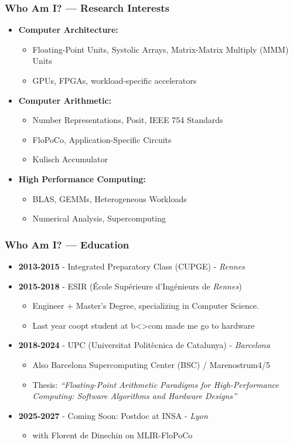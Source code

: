 \begin{frame}
	\frametitle{Who Am I? — Research Interests}
	\begin{itemize}
		\item<1-> \textbf{Computer Architecture:}
		\begin{itemize}
			\item Floating-Point Units, Systolic Arrays, Matrix-Matrix Multiply (MMM) Units
			\item GPUs, FPGAs, workload-specific accelerators
		\end{itemize}
		\item<2-> \textbf{Computer Arithmetic:}
		\begin{itemize}
			\item Number Representations, Posit, IEEE 754 Standards
			\item FloPoCo, Application-Specific Circuits
			\item Kulisch Accumulator
		\end{itemize}
		\item<3-> \textbf{High Performance Computing:}
		\begin{itemize}
			\item BLAS, GEMMs, Heterogeneous Workloads
			\item Numerical Analysis, Supercomputing
		\end{itemize}
	\end{itemize}
\end{frame}

\begin{frame}
	\frametitle{Who Am I? — Education}
	\begin{itemize}
		\item<1-> \textbf{2013-2015} - Integrated Preparatory Class (CUPGE) - \textit{Rennes}
		\item<2-> \textbf{2015-2018} - ESIR (\'Ecole Supérieure d'Ing\'enieurs de \textit{Rennes})
		\begin{itemize}
			\item Engineer + Master's Degree, specializing in Computer Science.
			\item Last year coopt student at b<>com made me go to hardware
		\end{itemize}
		\item<3-> \textbf{2018-2024} - UPC (Universitat Politècnica de Catalunya) - \textit{Barcelona}
		\begin{itemize}
			\item Also Barcelona Supercomputing Center (BSC) / Marenostrum4/5
			\item Thesis: \textit{``Floating-Point Arithmetic Paradigms for High-Performance Computing: Software Algorithms and Hardware Designs''}
		\end{itemize}
		\item<4-> \textbf{2025-2027} - Coming Soon: Postdoc at INSA - \textit{Lyon}
		\begin{itemize}
			\item with Florent de Dinechin on MLIR-FloPoCo
		\end{itemize}
	\end{itemize}
\end{frame}

